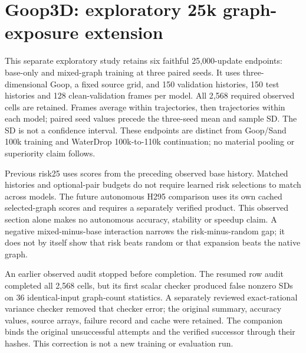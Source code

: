 \section{Goop3D: exploratory 25k graph-exposure extension}
\label{sec:goop3d-25k-exposure}
This separate exploratory study retains six faithful 25,000-update endpoints: base-only and mixed-graph training at three paired seeds. It uses three-dimensional Goop, a fixed source grid, and 150 validation histories, 150 test histories and 128 clean-validation frames per model. All 2,568 required observed cells are retained. Frames average within trajectories, then trajectories within each model; paired seed values precede the three-seed mean and sample SD. The SD is not a confidence interval. These endpoints are distinct from Goop/Sand 100k training and WaterDrop 100k-to-110k continuation; no material pooling or superiority claim follows.

Previous risk25 uses scores from the preceding observed base history. Matched histories and optional-pair budgets do not require learned risk selections to match across models. The future autonomous H295 comparison uses its own cached selected-graph scores and requires a separately verified product. This observed section alone makes no autonomous accuracy, stability or speedup claim. A negative mixed-minus-base interaction narrows the risk-minus-random gap; it does not by itself show that risk beats random or that expansion beats the native graph.

An earlier observed audit stopped before completion. The resumed row audit completed all 2,568 cells, but its first scalar checker produced false nonzero SDs on 36 identical-input graph-count statistics. A separately reviewed exact-rational variance checker removed that checker error; the original summary, accuracy values, source arrays, failure record and cache were retained. The companion binds the original unsuccessful attempts and the verified successor through their hashes. This correction is not a new training or evaluation run.


